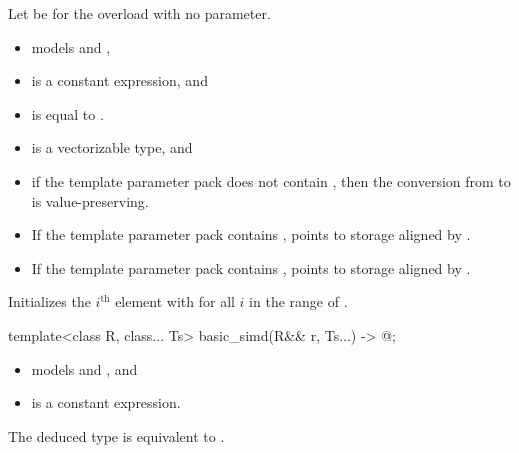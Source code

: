 \begin{itemdescr}
\pnum
Let  be  for the overload with no
 parameter.

\pnum
\constraints
\begin{itemize}
\item {} models  and
  ,
\item {} is a constant expression, and
\item {} is equal to .
\end{itemize}

\pnum
\mandates
\begin{itemize}
 \item
    is a vectorizable type, and
 \item
  if the template parameter pack  does not contain
  , then the conversion from
   to  is value-preserving.
\end{itemize}

\pnum
\expects
\begin{itemize}
 \item
   If the template parameter pack  contains
   ,  points to
   storage aligned by .
 \item
   If the template parameter pack  contains
   ,  points to
   storage aligned by .
\end{itemize}

\pnum
\effects
Initializes the $i^\text{th}$ element with  for all $i$ in the
range of .
\end{itemdescr}

\begin{itemdecl}
template<class R, class... Ts>
  basic_simd(R&& r, Ts...) -> @\seebelow@;
\end{itemdecl}

\begin{itemdescr}
\pnum
\constraints
\begin{itemize}
\item {} models  and
  , and
\item {} is a constant expression.
\end{itemize}

\pnum
\remarks
The deduced type is equivalent to .
\end{itemdescr}

